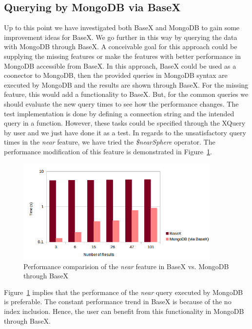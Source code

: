 \documentclass[a4paper,12pt]{article}
\begin{document}
\subsection{Querying by MongoDB via BaseX}
\label{MongoviaBX}
Up to this point we have investigated both BaseX and MongoDB to gain some improvement ideas for BaseX. We go further in this way by querying the data with MongoDB through BaseX. A conceivable goal for this approach could be supplying the missing features or make the features with better performance in MongoDB accessible from BaseX. In this approach, BaseX could be used as a coonector to MongoDB, then the provided queries in MongoDB syntax are executed by MongoDB and the results are shown through BaseX. For the missing feature, this would add a functionality to BaseX. But, for the common queries we should evaluate the new query times to see how the performance changes. 
The test implementation is done by defining a connection string and the intended query in a function. However, these tasks could be specified through the XQuery by user and we just have done it as a test. 
In regards to the unsatisfactory query times in the \textit{near} feature, we have tried the \textit{\$nearSphere} operator. The performance modification of this feature is demonstrated in Figure~\ref{figMongoviaBX-near}.
 
\begin{figure}
\centering
\includegraphics[width=0.9\textwidth]{MongoviaBX-near-sec-log.png}
\caption{Performance comparision of the \textit{near} feature in BaseX vs. MongoDB through BaseX}
\label{figMongoviaBX-near}
\end{figure}

Figure~\ref{figMongoviaBX-near} implies that the performance of the \textit{near} query executed by MongoDB is preferable. The constant performance trend in BaseX is because of the no index inclusion. Hence, the user can benefit from this functionality in MongoDB through BaseX. 
\end{document}
